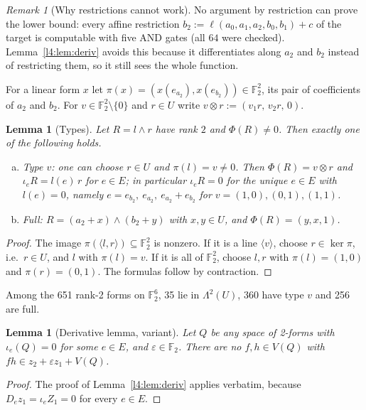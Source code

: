 \documentclass[11pt,a4paper]{article}
\theoremstyle{plain}
\newtheorem{lemma}[theorem]{Lemma}
\theoremstyle{remark}
\newtheorem{remark}[theorem]{Remark}
\newcommand{\F}{\mathbb F_2}
\newcommand{\Lam}{\Lambda^2}
\newcommand{\Dir}{E}
\begin{document}
\begin{remark}[Why restrictions cannot work]\label{l4:rem:restrictions}
No argument by restriction can prove the lower bound: every affine restriction $b_2:=\ell(a_0,a_1,a_2,b_0,b_1)+c$ of the target is computable with five AND gates (all $64$ were checked). Lemma~\ref{l4:lem:deriv} avoids this because it differentiates along $a_2$ and $b_2$ instead of restricting them, so it still sees the whole function.
\end{remark}



For a linear form $x$ let $\pi(x)=(x(e_{a_2}),x(e_{b_2}))\in\F^2$, its pair of coefficients of $a_2$ and $b_2$. For $v\in\F^2\setminus\{0\}$ and $r\in U$ write $v\otimes r:=(v_1r,\,v_2r,\,0)$.

\begin{lemma}[Types]\label{l4:lem:types}
Let $R=l\wedge r$ have rank $2$ and $\Phi(R)\neq0$. Then exactly one of the following holds.
\begin{enumerate}[(a)]
  \item \emph{Type $v$:} one can choose $r\in U$ and $\pi(l)=v\neq0$. Then $\Phi(R)=v\otimes r$ and $\iota_eR=l(e)\,r$ for $e\in\Dir$; in particular $\iota_eR=0$ for the unique $e\in\Dir$ with $l(e)=0$, namely $e=e_{b_2},\ e_{a_2},\ e_{a_2}+e_{b_2}$ for $v=(1,0),(0,1),(1,1)$.
  \item \emph{Full:} $R=(a_2+x)\wedge(b_2+y)$ with $x,y\in U$, and $\Phi(R)=(y,x,1)$.
\end{enumerate}
\end{lemma}

\begin{proof}
The image $\pi(\langle l,r\rangle)\subseteq\F^2$ is nonzero. If it is a line $\langle v\rangle$, choose $r\in\ker\pi$, i.e.\ $r\in U$, and $l$ with $\pi(l)=v$. If it is all of $\F^2$, choose $l,r$ with $\pi(l)=(1,0)$ and $\pi(r)=(0,1)$. The formulas follow by contraction.
\end{proof}

Among the 651 rank-2 forms on $\F^6$, 35 lie in $\Lam(U)$, 360 have type $v$ and 256 are full.


\begin{lemma}[Derivative lemma, variant]\label{l3:lem:deriv}
Let $Q$ be any space of 2-forms with $\iota_e(Q)=0$ for some $e\in E$, and $\varepsilon\in\F$. There are no $f,h\in V(Q)$ with $fh\in z_2+\varepsilon z_1+V(Q)$.
\end{lemma}
\begin{proof}
The proof of Lemma~\ref{l4:lem:deriv} applies verbatim, because $D_ez_1=\iota_eZ_1=0$ for every $e\in E$.
\end{proof}
\end{document}
